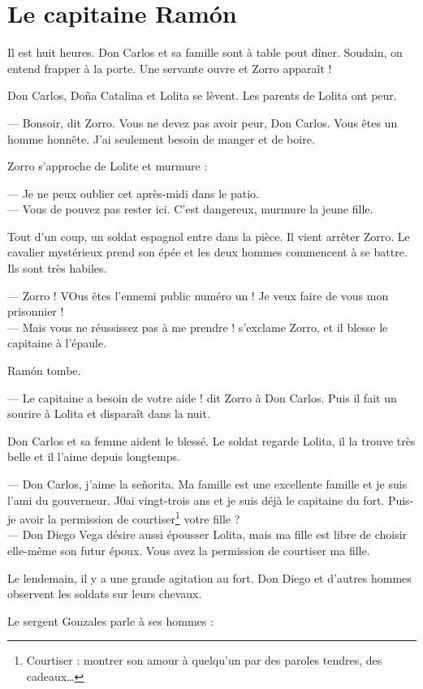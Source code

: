 \chapter{Le capitaine Ramón}
Il est huit heures. Don Carlos et sa famille sont à table pout dîner. Soudain, on entend frapper à la porte. Une servante ouvre et
Zorro apparaît !

Don Carlos, Doña Catalina et Lolita se lèvent. Les parents de Lolita ont peur.

--- Bonsoir, dit Zorro. Vous ne devez pas avoir peur, Don Carlos. Vous êtes un homme honnête. J'ai seulement besoin de manger et
    de boire.

Zorro s'approche de Lolite et murmure :

--- Je ne peux oublier cet après-midi dans le patio.\\
--- Vous de pouvez pas rester ici. C'est dangereux, murmure la jeune fille.

Tout d'un coup, un soldat espagnol entre dans la pièce. Il vient arrêter Zorro. Le cavalier mystérieux prend son épée et les deux
hommes commencent à se battre. Ils sont très habiles.

--- Zorro ! VOus êtes l'ennemi public numéro un ! Je veux faire de vous mon prisonnier !\\
--- Mais vous ne réussissez pas à me prendre ! s'exclame Zorro, et il blesse le capitaine à l'épaule.

Ramón tombe.

--- Le capitaine a besoin de votre aide ! dit Zorro à Don Carlos. Puis il fait un sourire à Lolita et disparaît dans la nuit.

Don Carlos et sa femme aident le blessé. Le soldat regarde Lolita, il la trouve très belle et il l'aime depuis longtemps.

--- Don Carlos, j'aime la señorita. Ma famille est une excellente famille et je suis l'ami du gouverneur. J0ai vingt-trois ans et
    je suis déjà le capitaine du fort. Puis-je avoir la permission de courtiser\footnote{Courtiser : montrer son amour à quelqu'un
    par des paroles tendres, des cadeaux\ldots{}} votre fille ?\\
--- Don Diego Vega désire aussi épousser Lolita, mais ma fille est libre de choisir elle-même son futur époux. Vous avez la
    permission de courtiser ma fille.

Le lendemain, il y a une grande agitation au fort. Don Diego et d'autres hommes observent les soldats sur leurs chevaux.

Le sergent Gonzales parle à ses hommes :

